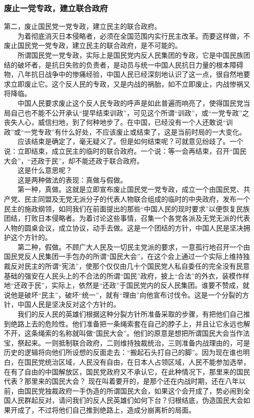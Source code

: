 \documentclass[cn,11pt,chinese]{elegantbook}
\def\myformat#1{\hfil\hfil #1}
\begin{document}
\subsubsection*{\myformat{废止一党专政，建立联合政府}}
第二，废止国民党一党专政，建立民主的联合政府。\\
　　为着彻底消灭日本侵略者，必须在全国范围内实行民主改革。而要这样做，不废止国民党一党专政，建立民主的联合政府，是不可能的。\\
　　所谓国民党一党专政，实际上是国民党内反人民集团的专政，它是中国民族团结的破坏者，是抗日失败的负责者，是动员与统一中国人民抗日力量的根本障碍物，八年抗日战争中的惨痛经验，中国人民已经深刻地认识了这一点，很自然地要求立即废止它。这个反人民的专政，又是内战的祸胎，如不立即废止，内战惨祸又将降临。\\
　　中国人民要求废止这个反人民专政的呼声是如此普遍而响亮了，使得国民党当局自己也不能不公开承认“提早结束训政”，可见这个所谓“训政”，或“一党专政”之丧失人心，威信扫地，到了何种地步了。在中国，已经没有一个人还敢说“训政”或“一党专政”有什么好处，不应该废止或结束了，这是当前时局的一大变化。\\
　　应该结束是确定了，毫无疑义了。但是如何结束呢？可就意见纷歧了。一个说：立即结束，成立民主的临时的联合政府。一个说：等一会再结束，召开“国民大会”，“还政于民”，却不能还政于联合政府。\\
　　这是什么意思呢？\\
　　这是两种做法的表现：真做与假做。\\
　　第一种，真做。这就是立即宣布废止国民党一党专政，成立一个由国民党、共产党、民主同盟及无党无派分子的代表人物联合组成的临时的中央政府，发布一个民主的施政纲领，如同我们在前面提出的那些“中国人民的现时要求”以便恢复民族团结，打败日本侵略者。为着讨论这些事情，召集一个各党各派及无党无派的代表人物的圆桌会议，成立协议，动手去做。这是一个团结的方针，中国人民是坚决拥护这个方针的。\\
　　第二种，假做。不顾广大人民及一切民主党派的要求，一意孤行地召开一个由国民党反人民集团一手包办的所谓“国民大会”，在这个会上通过一个实际上维持独裁反对民主的所谓“宪法”，使那个仅仅由几十个国民党人私自委任的完全没有民意基础的强安在人民头上的不合法的所谓“国民”政府，披上“合法”的外衣，装模作样地“还政于民”，实际上，依然是“还政”于国民党内的反人民集团。谁要不赞成，就说他是破坏“民主”，破坏“统一”，就有“理由”向他宣布讨伐令。这是一个分裂的方针，中国人民是坚决反对这个方针的。\\
　　我们的反人民的英雄们根据这种分裂方针所准备采取的步骤，有把他们自己推到绝路上去的危险性。他们准备把一条绳索套在自己的脖子上，并且让它永远也解不开，这条绳索的名称就叫做“国民大会”。他们的原意是想把所谓国民大会当作法宝，祭起来。一则抵制联合政府，二则维持独裁统治，三则准备内战理由的，可是历史的逻辑将向他们所设想的反面走去：“搬起石头打自己的脚”。因为现在谁也明白，在国民党统治区域，人民没有自由，在日本人占领区域，人民不能参加选举，在有了自由的中国解放区，国民党政府又不承认它，在此种情况下，那里来的国民代表？那里来的国民大会？ 现在叫着要开的，是那个还在内战时期，还在八年以前，由国民党独裁政府一手伪造的所谓国民大会，如果这个会开成了，势必闹到全国人民群起反对，请问我们的反人民英雄们如何下台？归根结底，伪造国民大会如果开成了，不过将他们自己推到绝路上，造成分崩离析的局面。\\
\end{document}
